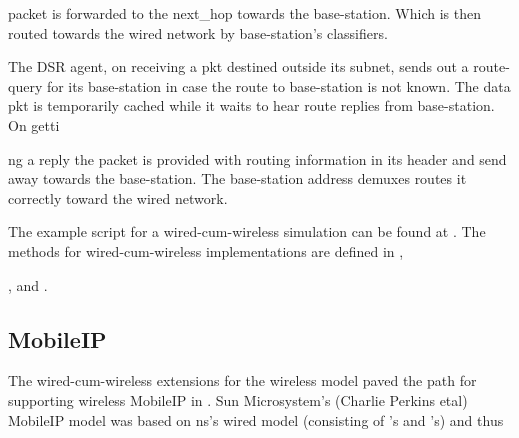 {packet is forwarded to the next\_hop towards the base-station. Which is then routed towards the wired network by base-station's classifiers.

The DSR agent, on receiving a pkt destined outside its subnet, sends out a route-query for its base-station in case the route to base-station is not known. The data pkt is temporarily cached while it waits to hear route replies from base-station. On getti





















ng a reply the packet is provided with routing information in its header and send away towards the base-station. The base-station address demuxes routes it correctly toward the wired network. 

The example script for a wired-cum-wireless simulation can be found at . The methods for wired-cum-wireless implementations are defined in , 





















,  and .


\subsection{MobileIP}
\label{sec:mobileip}

The wired-cum-wireless extensions for the wireless model paved the path for supporting wireless MobileIP in \ns. Sun Microsystem's (Charlie Perkins etal) MobileIP model was based on ns's wired model (consisting of 's and 's) and thus





















}
